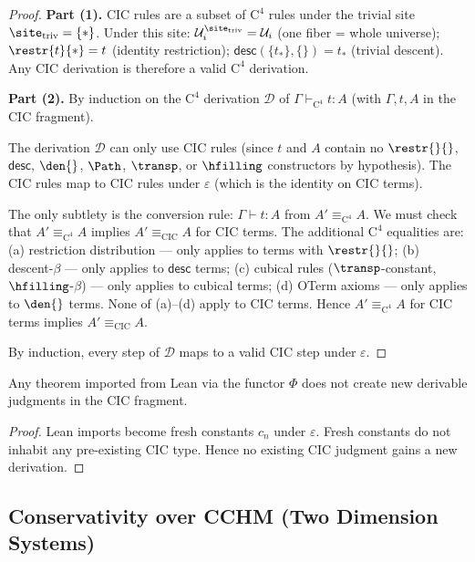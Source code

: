 \begin{proof}
\textbf{Part (1).}
CIC rules are a subset of $\mathrm{C}^4$ rules under the trivial site
$\site_\mathrm{triv} = \{\ast\}$.  Under this site:
$\mathcal{U}_i^{\site_\mathrm{triv}} = \mathcal{U}_i$ (one fiber = whole
universe); $\restr{t}{\ast} = t$ (identity restriction);
$\mathsf{desc}(\{t_\ast\},\{\}) = t_\ast$ (trivial descent).
Any CIC derivation is therefore a valid $\mathrm{C}^4$ derivation.

\textbf{Part (2).}
By induction on the $\mathrm{C}^4$ derivation $\mathcal{D}$ of
$\Gamma \vdash_{\mathrm{C}^4} t : A$ (with $\Gamma, t, A$ in the
CIC fragment).

The derivation $\mathcal{D}$ can only use CIC rules (since $t$ and $A$
contain no $\restr{}{}$, $\mathsf{desc}$, $\den{}$, $\Path$, $\transp$,
or $\hfilling$ constructors by hypothesis).  The CIC rules map to CIC
rules under $\varepsilon$ (which is the identity on CIC terms).

The only subtlety is the conversion rule: $\Gamma \vdash t : A$ from
$A' \equiv_{\mathrm{C}^4} A$.  We must check that
$A' \equiv_{\mathrm{C}^4} A$ implies $A' \equiv_\mathrm{CIC} A$
for CIC terms.  The additional $\mathrm{C}^4$ equalities are:
(a) restriction distribution --- only applies to terms with $\restr{}{}$;
(b) descent-$\beta$ --- only applies to $\mathsf{desc}$ terms;
(c) cubical rules ($\transp$-constant, $\hfilling$-$\beta$) --- only applies
to cubical terms;
(d) OTerm axioms --- only applies to $\den{}$ terms.
None of (a)--(d) apply to CIC terms.  Hence $A' \equiv_{\mathrm{C}^4} A$
for CIC terms implies $A' \equiv_\mathrm{CIC} A$.

By induction, every step of $\mathcal{D}$ maps to a valid CIC step
under $\varepsilon$.
\end{proof}

\begin{corollary}
\label{cor:lean-conservative}
Any theorem imported from Lean via the functor $\Phi$ does not create
new derivable judgments in the CIC fragment.
\end{corollary}

\begin{proof}
Lean imports become fresh constants $c_n$ under $\varepsilon$.  Fresh
constants do not inhabit any pre-existing CIC type.  Hence no existing
CIC judgment gains a new derivation.
\end{proof}

\subsection{Conservativity over CCHM (Two Dimension Systems)}
\label{sec:conservativity-cchm}

